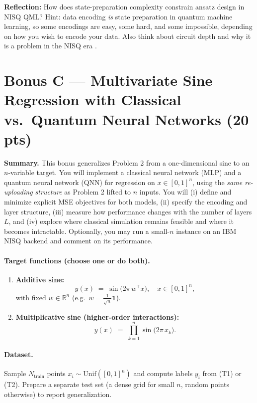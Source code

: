 \documentclass[11pt]{article}
\newenvironment{summary}{\par\noindent\textbf{Summary.} }{\par}
\begin{document}
\textbf{Reflection:} How does state-preparation complexity constrain ansatz design in NISQ QML? Hint: data encoding \emph{is} state preparation in quantum machine learning, so some encodings are easy, some hard, and some impossible, depending on how you wish to encode your data. Also think about circuit depth and why it is a problem in the NISQ era \smiley{}.

\newpage
\section*{Bonus C — Multivariate Sine Regression with Classical vs.\ Quantum Neural Networks (20 pts)}

\begin{summary}
This bonus generalizes Problem 2 from a one-dimensional sine to an $n$-variable target. You will implement a classical neural network (MLP) and a quantum neural network (QNN) for regression on $x\in[0,1]^n$, using the \emph{same re-uploading structure} as Problem 2 lifted to $n$ inputs. You will (i) define and minimize explicit MSE objectives for both models, (ii) specify the encoding and layer structure, (iii) measure how performance changes with the number of layers $L$, and (iv) explore where classical simulation remains feasible and where it becomes intractable. Optionally, you may run a small-$n$ instance on an IBM NISQ backend and comment on its performance.
\end{summary}

\paragraph{Target functions (choose one or do both).}
\begin{enumerate}[label=(T\arabic*)]
\item \textbf{Additive sine:}
\[
y(x) \;=\; \sin\!\big(2\pi\, w^\top x\big),
\quad x\in[0,1]^n,
\]
with fixed $w\in\mathbb{R}^n$ (e.g.\ $w=\tfrac{1}{\sqrt{n}}\mathbf{1}$).
\item \textbf{Multiplicative sine (higher-order interactions):}
\[
y(x) \;=\; \prod_{k=1}^n \sin\!\big(2\pi\,x_k\big).
\]
\end{enumerate}

\paragraph{Dataset.}
Sample $N_{\text{train}}$ points $x_i\sim\mathrm{Unif}([0,1]^n)$ and compute labels $y_i$ from (T1) or (T2). Prepare a separate test set (a dense grid for small $n$, random points otherwise) to report generalization.
\end{document}
